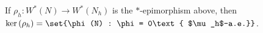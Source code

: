 \documentclass[10pt]{mypackage}
\begin{document}
\begin{corollary}
  If $\rho_h\colon W^{\ast}\left( N \right)\to W^{\ast}\left( N_h \right)$ is the $\ast$-epimorphism above, then $\ker\left( \rho_h \right) = \set{\phi(N) : \phi = 0\text{ $\mu_h$-a.e.}}$.
\end{corollary}
\nocite{analysis_now,conway_functional_analysis,brown_and_ozawa,morita_equivalence_cstar_algebras}
\printbibliography
\end{document}
